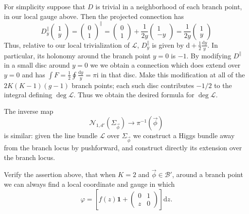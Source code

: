 \documentclass[12pt,letterpaper,reqno]{article}
\numberwithin{equation}{section}
\newcommand{\cB}{\ensuremath{\mathcal B}}
\newcommand{\cL}{\ensuremath{\mathcal L}}
\newcommand{\cN}{\ensuremath{\mathcal N}}
\newcommand{\half}{\ensuremath{\frac{1}{2}}}
\newcommand{\I}{{\mathrm i}}
\newcommand\bid{{\mathbf 1}}
\newcommand{\de}{\mathrm{d}}
\begin{document}
\begin{pf}
For simplicity suppose that 
$D$ is trivial in a neighborhood of each branch point,
in our local gauge above. Then the projected connection
has
\begin{equation}
 D^\parallel_y \begin{pmatrix} 1 \\ y \end{pmatrix} = \begin{pmatrix} 0 \\ 1 \end{pmatrix}^\parallel = \begin{pmatrix} 0 \\ 1 \end{pmatrix} + \frac{1}{2y} \begin{pmatrix} 1 \\ -y \end{pmatrix} = \frac{1}{2y} \begin{pmatrix} 1 \\ y \end{pmatrix}
\end{equation}
Thus, relative to our local trivialization of $\cL$, $D_y^\parallel$
is given by $\de + \frac{1}{2} \frac{\de y}{y}$.
In particular, its holonomy around the branch point $y=0$
is $-1$.
By modifying $D^\parallel$ in a small disc around $y=0$
we we obtain a connection which does extend over $y = 0$ 
and has $\int F = \half \oint \frac{\de y}{y} = \pi \I$ in that disc.
Make this modification at all of the $2K(K-1)(g-1)$ branch points;
each such disc contributes $-1/2$ to the integral defining $\deg \cL$.
Thus we obtain the desired formula for $\deg \cL$.

The inverse map 
\begin{equation}
\cN_{1,d'}(\Sigma_{\vec\phi}) \to \pi^{-1}(\vec\phi) 
\end{equation}
is similar: given the line bundle $\cL$
over $\Sigma_{\vec\phi}$ we construct a Higgs bundle
away from the branch locus by pushforward, and construct 
directly its extension over the branch locus.
\end{pf}

\begin{exercise} Verify the assertion above, that when $K=2$
and $\vec\phi \in \cB'$, around a branch point we can 
always find a local coordinate and gauge in which 
\begin{equation}
 \varphi = \left[f(z) \bid + \begin{pmatrix} 0 & 1 \\ z & 0 \end{pmatrix}\right] \de z.
\end{equation}
\end{exercise}
\end{document}
